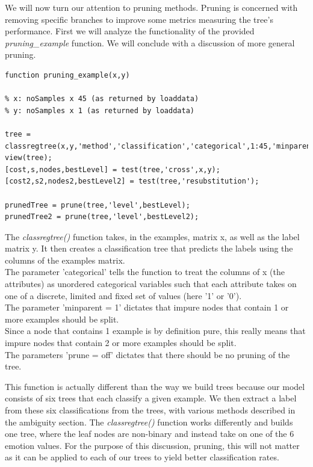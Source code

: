 We will now turn our attention to pruning methods. Pruning is concerned with removing specific branches to improve some metrics measuring
the tree's performance. First we will analyze the functionality of the provided \emph{pruning\_example} function.
We will conclude with a discussion of more general pruning.



\lstset{language=matlab}

\begin{lstlisting}
function pruning_example(x,y)
    
% x: noSamples x 45 (as returned by loaddata)
% y: noSamples x 1 (as returned by loaddata)

tree = classregtree(x,y,'method','classification','categorical',1:45,'minparent',1,'prune','off');
view(tree);
[cost,s,nodes,bestLevel] = test(tree,'cross',x,y);
[cost2,s2,nodes2,bestLevel2] = test(tree,'resubstitution');

prunedTree = prune(tree,'level',bestLevel);
prunedTree2 = prune(tree,'level',bestLevel2);

\end{lstlisting}




The \emph{classregtree()} function takes, in the examples, matrix x, as well as the label matrix y.
It then creates a classification tree that predicts the labels using the columns of the examples matrix.\\
The parameter 'categorical' tells the function to treat the columns of x (the attributes) as unordered categorical variables
such that each attribute takes on one of a discrete, limited and fixed set of values (here '1' or '0').\\
The parameter 'minparent = 1' dictates that impure nodes that contain 1 or more examples should be split.\\
Since a node that contains 1 example is by definition pure,
this really means that impure nodes that contain 2 or more examples should be split.\\
The parameters 'prune = off' dictates that there should be no pruning of the tree.

This function is actually different than the way we build trees because our model consists of six trees that each classify a given
example.
We then extract a label from these six classifications from the trees, with various methods described in the ambiguity section.
The \emph{classregtree()} function works differently and builds one tree,
where the leaf nodes are non-binary and instead take on one of the 6 emotion values.
For the purpose of this discussion, pruning,
this will not matter as it can be applied to each of our trees to yield better classification rates.

